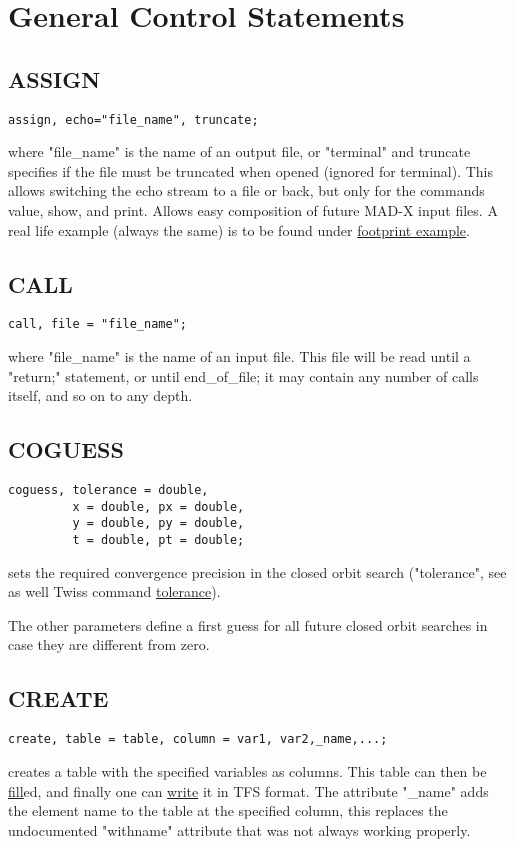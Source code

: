 %
\section{General Control Statements}

\subsection{ASSIGN}
\begin{verbatim}
assign, echo="file_name", truncate;
\end{verbatim} 
where "file\_name" is the name of an output file, or "terminal" and
truncate specifies if the file must be truncated when opened (ignored
for terminal). This allows switching the echo stream to a file or back,
but only for the commands value, show, and print. Allows easy
composition of future MAD-X input files. A real life example (always the
same) is to be found under \href{foot.html}{footprint example}.  

\subsection{CALL}
\begin{verbatim}
call, file = "file_name";
\end{verbatim} 
where "file\_name"  is the name of an input file. This file will be read
until a "return;" statement, or until end\_of\_file; it may contain any
number of calls itself, and so on to any depth.  

\subsection{COGUESS}
\label{subsec:general_coguess}
\begin{verbatim}
coguess, tolerance = double, 
         x = double, px = double, 
         y = double, py = double, 
         t = double, pt = double;
\end{verbatim} 
sets the required convergence precision in the closed orbit search
("tolerance", see as well Twiss command
\href{../twiss/twiss.html#tolerance}{tolerance}).  

The other parameters define a first guess for all future closed orbit
searches in case they are different from zero.  

\subsection{CREATE}
\begin{verbatim}
create, table = table, column = var1, var2,_name,...;
\end{verbatim} 
creates a table with the specified variables as columns. This table can
then be \hyperlink{fill}{fill}ed, and finally one can
\hyperlink{write}{write} it in TFS format. The attribute "\_name" adds
the element name to the table at the specified column, this replaces the
undocumented "withname" attribute that was not always working properly.  


